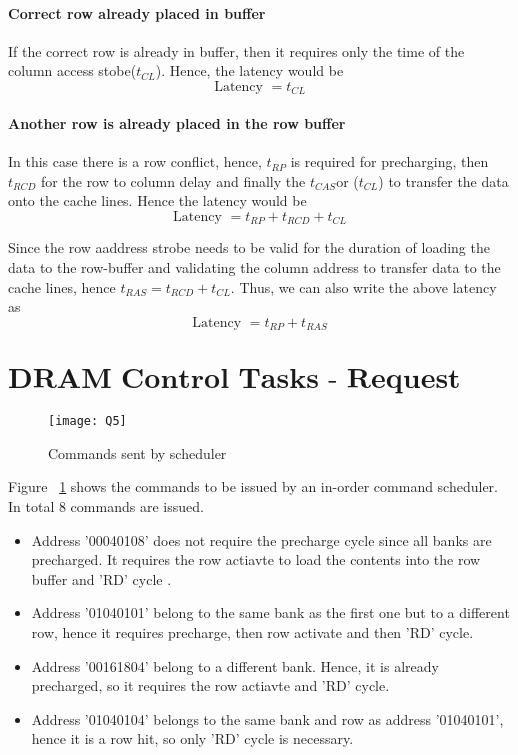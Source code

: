\documentclass{tufte-handout}
\begin{document}
	\paragraph{Correct row already placed in buffer}
		If the correct row is already in buffer, then it requires only the  time of the column access stobe($t_{CL}$). Hence, the latency would be 
			\[
				\mbox{Latency } = t_{CL}
			\]

	\paragraph{Another row is already placed in the row buffer}
		In this case there is a row conflict, hence, $t_{RP}$ is required for precharging, then $t_{RCD}$ for the row to column delay and finally the $t_{CAS}$or ($t_{CL}$) to transfer the data onto the cache lines. Hence the latency would be
		\[
			\mbox{Latency } = t_{RP} + t_{RCD} + t_{CL}
		\]

		Since the row aaddress strobe needs to be valid for the duration of loading the data to the row-buffer and validating the column address to transfer data to the cache lines, hence $t_{RAS} = t_{RCD} + t_{CL}$. Thus, we can also write the above latency as
		\[
			\mbox{Latency } = t_{RP} + t_{RAS}
		\]

\section{$\textbf{DRAM Control Tasks - Request Scheduling}$}
		\begin{figure}[h!]
		\label{fig:q5}
		\centering
		\texttt{[image: Q5]}
		\caption{ Commands sent by scheduler }
		\end{figure}

		Figure ~\ref{fig:q5} shows the commands to be issued by an in-order command scheduler.  In total 8 commands are issued.
		\begin{itemize}
			\item Address '00040108' does not require the precharge cycle since all banks are precharged. It requires the row actiavte to load the contents into the row buffer and 'RD' cycle .
			\item Address '01040101' belong to the same bank as the first one but to a different row, hence it requires precharge, then row activate and then 'RD' cycle.
			\item Address '00161804' belong to a different bank. Hence, it is already precharged, so it requires the row actiavte and 'RD' cycle.
			\item Address '01040104' belongs to the same bank and row as address '01040101', hence it is a row hit, so only 'RD' cycle is necessary.
		\end{itemize}


  
  
  
  
\end{document}
